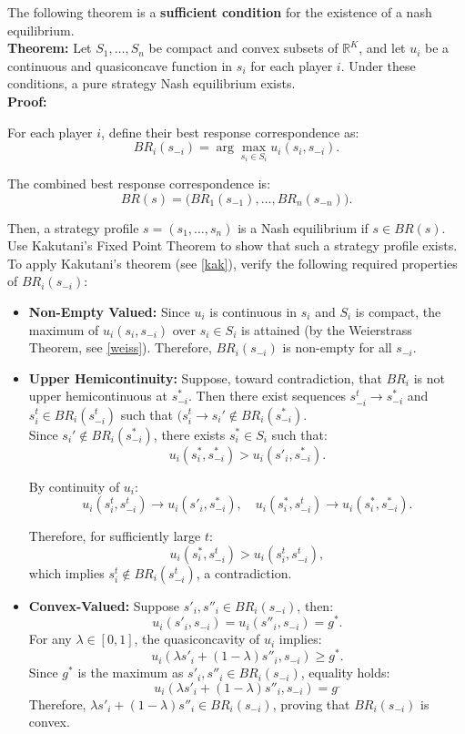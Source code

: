 \documentclass{article}
\begin{document}
The following theorem is a \textbf{sufficient condition} for the existence of a nash equilibrium. \\

\textbf{Theorem:} Let \(S_1, \ldots, S_n\) be compact and convex subsets of \(\mathbb{R}^K\), and let \(u_i\) be a continuous and quasiconcave function in \(s_i\) for each player \(i\). Under these conditions, a pure strategy Nash equilibrium exists.
\\
\textbf{Proof:}

For each player \(i\), define their best response correspondence as:
\[
    BR_i(s_{-i}) = \arg\max_{s_i \in S_i} u_i(s_i, s_{-i}).
\]

The combined best response correspondence is:
\[
    BR(s) = \big(BR_1(s_{-1}), \ldots, BR_n(s_{-n})\big).
\]

Then, a strategy profile \(s = (s_1, \ldots, s_n)\) is a Nash equilibrium if \(s \in BR(s)\). Use Kakutani’s Fixed Point Theorem to show that such a strategy profile exists. To apply Kakutani’s theorem (see \ref{kak}), verify the following required properties of \(BR_i(s_{-i})\):
\begin{itemize}
    \item \textbf{Non-Empty Valued:} Since \(u_i\) is continuous in \(s_i\) and \(S_i\) is compact, the maximum of \(u_i(s_i, s_{-i})\) over \(s_i \in S_i\) is attained (by the Weierstrass Theorem, see \ref{weiss}). Therefore, \(BR_i(s_{-i})\) is non-empty for all \(s_{-i}\).
    
    \item \textbf{Upper Hemicontinuity:} Suppose, toward contradiction, that \(BR_{i}\) is not upper hemicontinuous at \(s^{*}_{-i}\). Then there exist sequences \(s^t_{-i} \to s^*_{-i}\) and \(s^t_{i} \in BR_i(s^{t}_{-i})\) such that $(s^{t}_{i} \to s_{i}' \notin BR_{i}(s_{-i}^{*})$. \\ 

    Since \(s_{i}' \notin BR_{i}(s^{*}_{-i})\), there exists \(s^{*}_{i} \in S_{i}\) such that:
    \[
        u_i(s^*_{i}, s^*_{-i}) > u_i(s'_{i}, s^*_{-i}).
    \]

    By continuity of \(u_i\):
    \[
        u_i(s^t_{i}, s^t_{-i}) \to u_i(s'_i, s^*_{-i}), \quad u_i(s^*_{i}, s^t_{-i}) \to u_i(s^*_{i}, s^*_{-i}).
    \]

    Therefore, for sufficiently large \(t\):
    \[
        u_i(s^*_{i}, s^t_{-i}) > u_i(s^t_{i}, s^t_{-i}),
    \]
    which implies \(s^t_i \notin BR_i(s^t_{-i})\), a contradiction.
    
    \item \textbf{Convex-Valued:} Suppose \(s'_i, s''_i \in BR_i(s_{-i})\), then:
    \[
        u_i(s'_{i}, s_{-i}) = u_i(s''_{i}, s_{-i}) = g^*.
    \]
    For any \(\lambda \in [0, 1]\), the quasiconcavity of \(u_i\) implies:
    \[
        u_i(\lambda s'_i + (1 - \lambda)s''_i, s_{-i}) \geq g^*.
    \]
    Since \(g^*\) is the maximum as \(s'_i, s''_i \in BR_i(s_{-i})\), equality holds:
    \[
        u_i(\lambda s'_i + (1 - \lambda)s''_i, s_{-i}) = g^.
    \]
    Therefore, \(\lambda s'_i + (1 - \lambda)s''_i \in BR_i(s_{-i})\), proving that \(BR_i(s_{-i})\) is convex.
\end{itemize}
\end{document}
